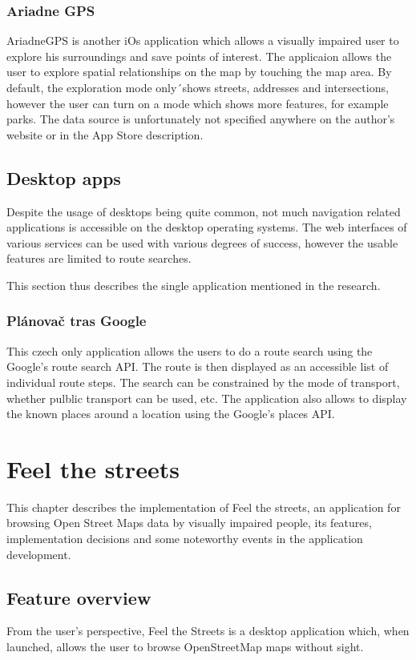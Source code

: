 \documentclass[nolof,digital]{fithesis3}
\begin{document}
\subsection{Ariadne GPS}
AriadneGPS \parencite{ariadnegps} is another iOs application which allows a visually impaired  user to explore his surroundings and save points of interest. The applicaion allows the user to explore spatial relationships on the map by touching the map area. By default, the exploration mode only´shows streets, addresses and intersections, however the user can turn on a mode which shows more features, for example parks. The data source is unfortunately not specified anywhere on the author's website or in the App Store description.
\section{Desktop apps}
Despite the usage of desktops being quite common, not much navigation related applications is accessible on the desktop operating systems. The web interfaces of various services can be used with various degrees of success, however the usable features are limited to route searches.

This section thus describes the single application mentioned in the research.
\subsection{Plánovač tras Google}
This czech only application \parencite{ptg} allows the users to do a route search using the Google's route search API. The route is then displayed as an accessible list of individual route steps. The search can be constrained by the mode of transport, whether pulblic transport can be used, etc. The application also allows to display the known places around a location using the Google's places API.
\chapter{Feel the streets}
This chapter describes the implementation of Feel the streets, an application for browsing Open Street Maps data by visually impaired people, its features, implementation decisions and some noteworthy events in the application development.
\section{Feature overview}
From the user's perspective, Feel the Streets is a desktop application which, when launched, allows the user to browse OpenStreetMap maps without sight.
\end{document}
